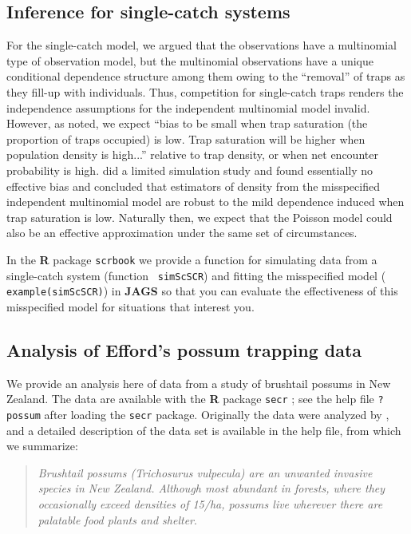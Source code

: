 \subsection{Inference for single-catch systems}

For the single-catch model, we argued that the observations have a
multinomial type of observation model, but the multinomial
observations have a unique conditional dependence structure among them
owing to the ``removal'' of traps as they fill-up with individuals.
Thus, competition for single-catch traps renders the independence
assumptions for the independent multinomial model invalid.  However,
as \citet{efford_etal:2009euring} noted, we expect ``bias to be small
when trap saturation (the proportion of traps occupied) is low.  Trap
saturation will be higher when population density is high...''
relative to trap density, or when net encounter probability is high.
\citet{efford_etal:2009euring} did a limited simulation study and
found essentially no effective bias and concluded that estimators of
density from the misspecified independent multinomial model are robust
to the mild dependence induced when trap saturation is low.  Naturally
then, we expect that the Poisson model could also be an effective
approximation under the same set of circumstances.

In the {\bf R} package \mbox{\tt scrbook} we provide a function for
simulating data from a single-catch system (function \mbox{\tt
  simScSCR}) and fitting the misspecified model (\mbox{\tt
  example(simScSCR)}) in {\bf JAGS} so that you can
evaluate the effectiveness of this misspecified model for
situations that interest you.


\subsection{Analysis of Efford's possum trapping data}

We provide an analysis here of data from a study of brushtail possums
in New Zealand. The data are available with the {\bf R} package
\mbox{\tt secr} \citep{efford_etal:2009euring}; see the help file
\mbox{\tt ?possum} after loading the \mbox{\tt secr} package.
Originally the data were analyzed by \citet{efford_etal:2005}, and a
detailed description of the data set is available in the help file,
from which we summarize:

\begin{quote}
{\it Brushtail possums (Trichosurus vulpecula) are an unwanted invasive
species in New Zealand. Although most abundant in forests, where they
occasionally exceed densities of 15/ha, possums live wherever there
are palatable food plants and shelter}.
\end{quote}

